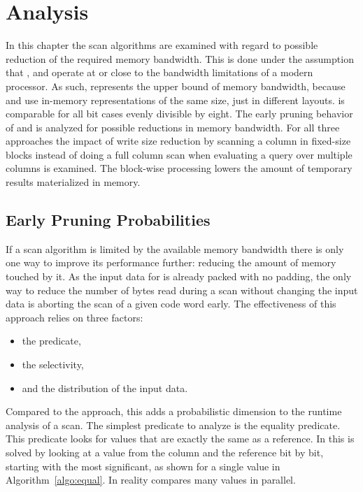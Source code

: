 \chapter{Analysis}
\label{chapter:analysis}

In this chapter the scan algorithms are examined with regard to possible
reduction of the required memory bandwidth. This is done under the assumption
that \simdscan{}, \bwv{} and \bs{} operate at or close to the bandwidth
limitations of a modern processor. As such, \simdscan{} represents the upper
bound of memory bandwidth, because \simdscan{} and \bwv{} use in-memory
representations of the same size, just in different layouts. \bs{} is comparable
for all bit cases evenly divisible by eight. The early pruning behavior of
\bwv{} and \bs{} is analyzed for possible reductions in memory bandwidth. For
all three approaches the impact of write size reduction by scanning a column in
fixed-size blocks instead of doing a full column scan when evaluating a query
over multiple columns is examined. The block-wise processing lowers the amount
of temporary results materialized in memory.

\section{Early Pruning Probabilities}

If a scan algorithm is limited by the available memory bandwidth there is only
one way to improve its performance further: reducing the amount of memory
touched by it. As the input data for \bwv{} is already packed with no padding,
the only way to reduce the number of bytes read during a scan without changing
the input data is aborting the scan of a given code word early. The
effectiveness of this approach relies on three factors:

\begin{itemize}
  \item the predicate,
  \item the selectivity,
  \item and the distribution of the input data.
\end{itemize}

Compared to the \simdscan{} approach, this adds a probabilistic dimension to the
runtime analysis of a scan. The simplest predicate to analyze is the equality
predicate. This predicate looks for values that are exactly the same as a
reference. In \bwv{} this is solved by looking at a value from the column and
the reference bit by bit, starting with the most significant, as shown for a
single value in Algorithm~\ref{algo:equal}. In reality \bwv{} compares many
values in parallel.

